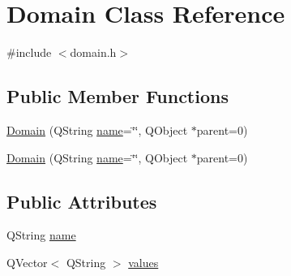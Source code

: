 \hypertarget{class_domain}{
\section{Domain Class Reference}
\label{class_domain}
}


{\ttfamily \#include $<$domain.h$>$}

\subsection*{Public Member Functions}
\begin{DoxyCompactItemize}
\item 
\hyperlink{class_domain_a6fffe6002e3626e8943d98e288d7fd35}{Domain} (QString \hyperlink{class_domain_ab0d9829a254c881dc4db3f2f12457362}{name}=\char`\"{}\char`\"{}, QObject $\ast$parent=0)
\item 
\hyperlink{class_domain_a6fffe6002e3626e8943d98e288d7fd35}{Domain} (QString \hyperlink{class_domain_ab0d9829a254c881dc4db3f2f12457362}{name}=\char`\"{}\char`\"{}, QObject $\ast$parent=0)
\end{DoxyCompactItemize}
\subsection*{Public Attributes}
\begin{DoxyCompactItemize}
\item 
QString \hyperlink{class_domain_ab0d9829a254c881dc4db3f2f12457362}{name}
\item 
QVector$<$ QString $>$ \hyperlink{class_domain_a44aa47cd5e2cee31a73758713effd7cc}{values}
\end{DoxyCompactItemize}


